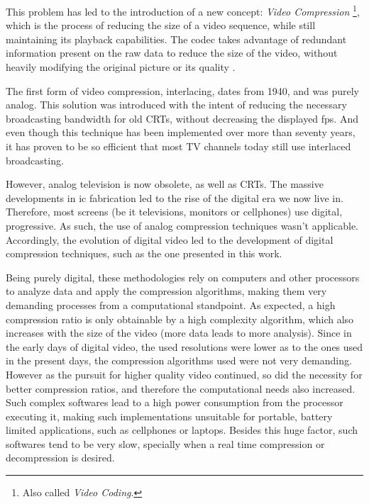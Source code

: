 This problem has led to the introduction of a new concept: \textit{Video Compression} \footnote{Also called \textit{Video Coding}.}, which is the process of reducing the size of a video sequence, while still maintaining its playback capabilities. The \Gls{codec} takes advantage of redundant information present on the raw data to reduce the size of the video, without heavily modifying the original picture or its quality
. 

The first form of video compression, \gls{interlacing}, dates from 1940, and was purely analog. This solution was introduced with the intent of reducing the necessary broadcasting bandwidth for old \glspl{CRT}, without decreasing the displayed fps. And even though this technique has been implemented over more than seventy years, it has proven to be so efficient that most TV channels today still use interlaced broadcasting.

However, analog television is now obsolete, as well as CRTs. The massive developments in \Gls{ic} fabrication led to the rise of the digital era we now live in. Therefore, most screens (be it televisions, monitors or cellphones) use digital, \gls{progressive}. As such, the use of analog compression techniques wasn't applicable. Accordingly, the evolution of digital video led to the development of digital compression techniques, such as the one presented in this work.

Being purely digital, these methodologies rely on computers and other processors to analyze data and apply the compression algorithms, making them very demanding processes from a computational standpoint. As expected, a high compression ratio is only obtainable by a high complexity algorithm, which also increases with the size of the video (more data leads to more analysis). Since in the early days of digital video, the used resolutions were lower as to the ones used in the present days, the compression algorithms used were not very demanding. However as the pursuit for higher quality video continued, so did the necessity for better compression ratios, and therefore the computational needs also increased. Such complex softwares lead to a high power consumption from the processor executing it, making such implementations unsuitable for portable, battery limited applications, such as cellphones or laptops. Besides this huge factor, such softwares tend to be very slow, specially when a real time compression or decompression is desired.

